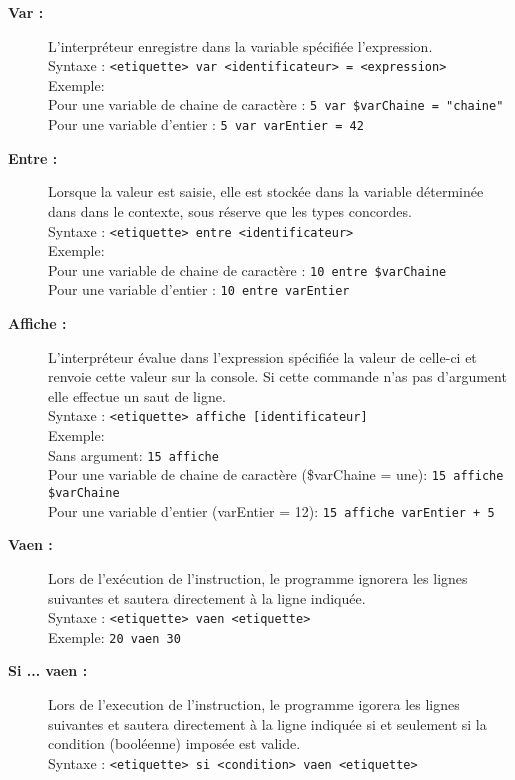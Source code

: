 \begin{description}
	\item [\textbf{Var :}] L'interpréteur enregistre dans la variable spécifiée l'expression.\\
	Syntaxe :
	\verb|<etiquette> var <identificateur> = <expression>|\\

	Exemple: \\
	Pour une variable de chaine de caractère :
	\verb|5 var $varChaine = "chaine"| \\
	Pour une variable d'entier :
	\verb|5 var varEntier = 42| 

	\item [\textbf{Entre :}] Lorsque la valeur est saisie, elle est stockée dans la variable déterminée dans dans le contexte, sous réserve que les types concordes.\\
	Syntaxe :
	\verb|<etiquette> entre <identificateur>|\\

	Exemple: \\
	Pour une variable de chaine de caractère :
	\verb|10 entre $varChaine| \\
	Pour une variable d'entier :
	\verb|10 entre varEntier|

	\item [\textbf{Affiche :}] L'interpréteur évalue dans l'expression spécifiée la valeur de celle-ci et renvoie cette valeur sur la console. Si cette commande n'as pas d'argument elle effectue un saut de ligne.\\
	Syntaxe :
	\verb|<etiquette> affiche [identificateur]|\\

	Exemple: \\
	Sans argument:
	\verb|15 affiche|\\
	Pour une variable de chaine de caractère (\$varChaine = une):
	\verb|15 affiche $varChaine| \\
	Pour une variable d'entier (varEntier = 12):
	\verb|15 affiche varEntier + 5|

	\item [\textbf{Vaen :}] Lors de l'exécution de l'instruction, le programme ignorera les lignes suivantes et sautera directement à la ligne indiquée.\\
	Syntaxe :
	\verb|<etiquette> vaen <etiquette>|\\

	Exemple: \verb|20 vaen 30|

	\item [\textbf{Si ... vaen :}] Lors de l'execution de l'instruction, le programme igorera les lignes suivantes et sautera directement à la ligne indiquée si et seulement si la condition (booléenne) imposée est valide.\\
	Syntaxe :
	\verb|<etiquette> si <condition> vaen <etiquette>|\\


\end{description}
